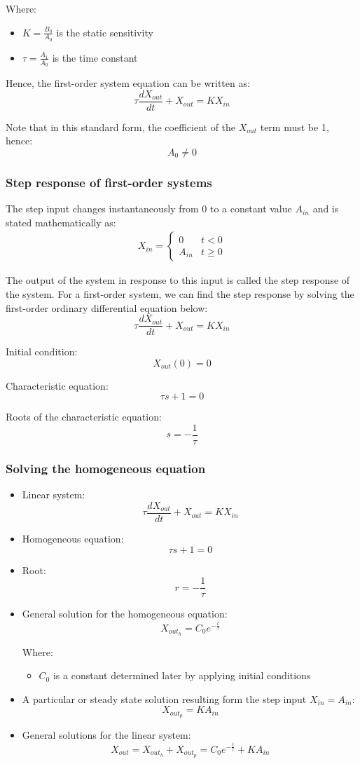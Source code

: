 \documentclass[11pt]{article}
\begin{document}
Where:
\begin{itemize}
\item \(K = \frac{B_0}{A_0}\) is the static sensitivity
\item \(\tau = \frac{A_1}{A_0}\) is the time constant
\end{itemize}

Hence, the first-order system equation can be written as:
\[\tau \frac{dX_{out}}{dt} + X_{out} = KX_{in}\]

Note that in this standard form, the coefficient of the \(X_{out}\) term must be 1, hence:
\[A_0 \ne 0\]
\subsubsection{Step response of first-order systems}
\label{sec:orgb56b2e6}
The step input changes instantaneously from 0 to a constant value \(A_{in}\) and is stated mathematically as:
\begin{align*}
X_{in} = \begin{cases}
0 & t < 0 \\
A_{in} & t \ge 0
\end{cases}
\end{align*}

The output of the system in response to this input is called the step response of the system. For a first-order system, we can find the step response by solving the first-order ordinary differential equation below:
\[\tau \frac{dX_{out}}{dt} + X_{out} = KX_{in}\]

Initial condition:
\[X_{out} (0) = 0\]

Characteristic equation:
\[\tau s + 1 = 0\]

Roots of the characteristic equation:
\[s = - \frac{1}{\tau}\]
\subsubsection{Solving the homogeneous equation}
\label{sec:orgc5ffcfd}
\begin{itemize}
\item Linear system:
\[\tau \frac{dX_{out}}{dt} + X_{out} = KX_{in}\]
\item Homogeneous equation:
\[\tau s + 1 = 0\]
\item Root:
\[r = - \frac{1}{\tau}\]
\item General solution for the homogeneous equation:
\[X_{out_h} = C_0 e^{- \frac{t}{\tau}}\]

Where:
\begin{itemize}
\item \(C_0\) is a constant determined later by applying initial conditions
\end{itemize}

\item A particular or steady state solution resulting form the step input \(X_{in} = A_{in}\):
\[X_{out_p} = KA_{in}\]
\item General solutions for the linear system:
\[X_{out} = X_{out_h} + X_{out_p} = C_0 e^{- \frac{t}{\tau}} + KA_{in}\]
\end{itemize}
\end{document}
